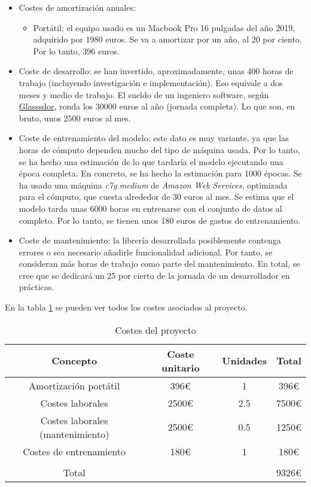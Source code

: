 \begin{itemize}
  \item Costes de amortización anuales:
  \begin{itemize}
    \item Portátil: el equipo usado es un Macbook Pro 16 pulgadas del año 2019, adquirido por 1980 euros. Se va a amortizar por un año, al 20 por ciento. Por lo tanto, 396 euros.
  \end{itemize}
  \item Coste de desarrollo: se han invertido, aproximadamente, unas 400 horas de trabajo (incluyendo investigación e implementación). Eso equivale a
  dos meses y medio de trabajo. El sueldo de un ingeniero software, según \href{https://www.glassdoor.com/}{Glasssdor}, ronda los 30000 euros al año (jornada completa). Lo que son, en bruto, unos
  2500 euros al mes.
  \item Coste de entrenamiento del modelo: este dato es muy variante, ya que las horas de cómputo dependen mucho del tipo de máquina usada. Por lo tanto, se ha hecho una estimación
  de lo que tardaría el modelo ejecutando una época completa. En concreto, se ha hecho la estimación para 1000 épocas. Se ha usado una máquina \textit{c7g.medium} de \textit{Amazon Web Services},
  optimizada para el cómputo, que cuesta alrededor de 30 euros al mes. Se estima que el modelo tarda unas 6000 horas en entrenarse con el conjunto de datos al completo. Por lo tanto, se tienen unos
  180 euros de gastos de entrenamiento.
  \item Coste de mantenimiento: la librería desarrollada posiblemente contenga errores o sea necesario añadirle funcionalidad adicional. Por tanto, se consideran más horas de trabajo como parte del mantenimiento.
  En total, se cree que se dedicará un 25 por cierto de la jornada de un desarrollador en prácticas.
\end{itemize}

En la tabla \ref{costes} se pueden ver todos los costes asociados al proyecto.

\begin{table}
  \centering
  \begin{tabular}{ cccc }
    \hline
    Concepto & Coste unitario & Unidades & Total \\
    \hline
    Amortización portátil & 396\euro{} & 1 & 396\euro{} \\
    Costes laborales & 2500\euro{} & 2.5 & 7500\euro{}\\
    Costes laborales (mantenimiento) & 2500\euro{} & 0.5 & 1250\euro{}\\
    Costes de entrenamiento & 180\euro{} & 1 & 180\euro{} \\
    \hline
     &  &  & \\
     Total &  &  & 9326\euro{}
  \end{tabular}
  \caption{Costes del proyecto}
  \label{costes}
\end{table}
